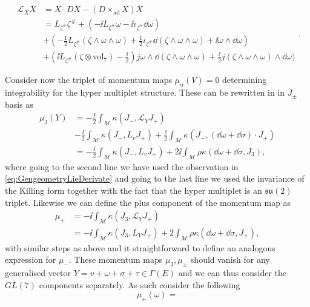 \begin{equation}
    \begin{aligned}
    \mathscr{L}_X\overbar{X} &= X\cdot D \overbar{X}-(D\times_{\text{ad}}X)\overbar{X}\\
        &= L_{\zeta^{\#}}\zeta^{\#}+(-\ii L_{\zeta^{\#}}\omega-\ii\iota_{\zeta^{\#}}\dd\omega)\\
        &+(-\frac{1}{2}L_{\zeta^{\#}}(\zeta\wedge\omega\wedge\omega)+\frac{1}{2}\iota_{\zeta^{\#}}\dd(\zeta\wedge\omega\wedge\omega)+\ii\omega\wedge\dd\omega)\\
        &+(\ii L_{\zeta^{\#}}(\zeta\otimes\text{vol}_7)-\frac{\ii}{2})j\omega\wedge\dd(\zeta\wedge\omega\wedge\omega)+\frac{\ii}{2}j(\zeta\wedge\omega\wedge\omega)\wedge\dd\omega)
    \end{aligned}.
\end{equation}

Consider now the triplet of momentum maps $\mu_\alpha(V)=0$ determining integrability for the hyper multiplet structure. These can be rewritten in in $J_\pm$ basis as 
\begin{equation}
    \begin{aligned}
    \mu_3(Y)&= -\frac{\ii}{2}\int_\mathcal{M} \kappa(J_-,\mathscr{L}_YJ_+)\\
            & -\frac{\ii}{2}\int_\mathcal{M}\kappa(J_-,L_vJ_+)+\frac{\ii}{2}\int_\mathcal{M}\kappa(J_-,(\dd\omega+\dd\sigma)\cdot J_+)\\
            &= -\frac{\ii}{2}\int_\mathcal{M}\kappa(J_-,L_vJ_+)+2\ii  \int_\mathcal{M}\rho\kappa(\dd\omega+\dd\sigma,J_3),
    \end{aligned}
\end{equation}
where going to the second line we have used the observation in \eqref{eq:GengeometryLieDerivate} and going to the last line we used the invariance of the Killing form together with the fact that the hyper multiplet is an $\mathfrak{su}(2)$ triplet. Likewise we can define the plus component of the momentum map as 
\begin{equation}
    \begin{aligned}
    \mu_+ &= -\ii\int_\mathcal{M}\kappa(J_3,\mathscr{L}_YJ_+)\\
          &= -\ii\int_\mathcal{M}\kappa(J_3,L_YJ_+)+2\int_\mathcal{M}\rho\kappa(\dd\omega+\dd\sigma,J_+),
    \end{aligned}
\end{equation}
with similar steps as above and it straightforward to define an analogous expression for $\mu_-$. These momentum maps $\mu_3,\mu_{\pm}$ should vanish for any generalised vector $Y=v+\omega+\sigma+\tau\in\Gamma(E)$ and we can thus consider the $GL(7)$ components separately. As such consider the following 
\begin{equation}
    \mu_+(\omega) = 
\end{equation}









